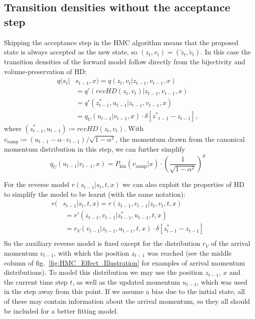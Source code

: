 \subsection{Transition densities without the acceptance step}
\label{sec:TransitionDensitiesNoAcceptance}
Skipping the acceptance step in the HMC algorithm means that the proposed state is always accepted as the new state, so $(z_t, v_t) = (\tilde{z}_t, \tilde{v}_t)$. In this case the transition densities of the forward model follow directly from the bijectivity and volume-preservation of HD:
\begin{equation} \label{eq:ForwardTransitionNoAcceptance}
\begin{split}
q(s_t|&s_{t-1}, x) = q(z_t, v_t| z_{t-1}, v_{t-1}, x) \\
&= q'(revHD(z_t, v_t)|z_{t-1}, v_{t-1}, x) \\
&= q'(z^*_{t-1}, u_{t-1} |z_{t-1}, v_{t-1}, x) \\
&= q_U(u_{t-1}|v_{t-1}, x) \cdot \delta[{z^*}_{t-1} - z_{t-1}],
\end{split}
\end{equation}
where $(z^*_{t-1}, u_{t-1}) \coloneqq revHD(z_t, v_t)$. With $v_{\textrm{samp}} \coloneqq (u_{t-1} - \alpha \cdot v_{t-1})/{\sqrt{1 - \alpha^2}}$, the momentum drawn from the canonical momentum distribution in this step, we can further simplify
\begin{equation} \label{eq:qUDefinition}
q_U(u_{t-1}|v_{t-1}, x) = P_\textrm{kin}(v_{\textrm{samp}}|x) \cdot (\frac{1}{\sqrt{1 - \alpha^2}})^{d}
\end{equation}

For the reverse model $r(s_{t-1}|s_t, t, x)$ we can also exploit the properties of HD to simplify the model to be learnt (with the same notation):
\begin{equation} \label{eq:ReverseTransitionNoAcceptance}
\begin{split}
r(&s_{t-1}|s_{t}, t, x) = r(z_{t-1}, v_{t-1}| z_t, v_t, t, x) \\
&\;= r'(z_{t-1}, v_{t-1} |z^*_{t-1}, u_{t-1},t , x) \\
&\;= r_V(v_{t-1}|z_{t-1}, u_{t-1}, t, x) \cdot \delta[z^*_{t-1} - z_{t-1}] \\
\end{split}
\end{equation}
So the auxiliary reverse model is fixed except for the distribution $r_V$ of the arrival momentum $v_{t-1}$, with which the position $z_{t-1}$ was reached (see the middle column of fig.~\ref{fig:HMC_Effect_Illustration} for examples of arrival momentum distributions). To model this distribution we may use the position $z_{t-1}$, $x$ and the current time step $t$, as well as the updated momentum $u_{t-1}$, which was used in the step away from this point. If we assume a bias due to the initial state, all of these may contain information about the arrival momentum, so they all should be included for a better fitting model.


